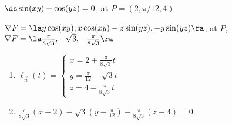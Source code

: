 {$\ds \sin(xy)+\cos(yz)=0$, at $P = (2, \pi/12, 4)$
}
{
$\nabla F = \la y\cos(xy), x\cos(xy)-z\sin(yz), -y\sin(yz)\ra$; at $P$, $\nabla F = \la \frac{\pi}{8\sqrt{3}}, -\sqrt{3},-\frac{\pi}{8\sqrt{3}}\ra$
\begin{enumerate}
	\item $\ell_{\vec n}(t) = \left\{\begin{array}{l} x= 2 +\frac{\pi}{8\sqrt{3}}t\\ y = \frac{\pi}{12}-\sqrt{3}t\\ z = 4-\frac{\pi}{8\sqrt{3}}t \end{array}\right.$
	\item		$\frac{\pi}{8\sqrt{3}}(x-2) -\sqrt{3}(y-\frac{\pi}{12}) -\frac{\pi}{8\sqrt{3}}(z-4) = 0$.
\end{enumerate}
}